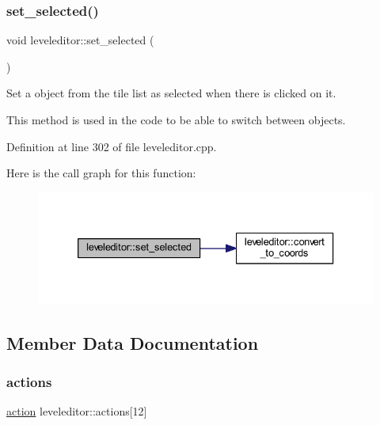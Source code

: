 \subsubsection{\texorpdfstring{set\+\_\+selected()}{set\_selected()}}
{\footnotesize\ttfamily void leveleditor\+::set\+\_\+selected (\begin{DoxyParamCaption}{ }\end{DoxyParamCaption})\hspace{0.3cm}{\ttfamily [private]}}



Set a object from the tile list as selected when there is clicked on it. 

This method is used in the code to be able to switch between objects. 

Definition at line 302 of file leveleditor.\+cpp.

Here is the call graph for this function\+:
\nopagebreak
\begin{figure}[H]
\begin{center}
\leavevmode
\includegraphics[width=333pt]{classleveleditor_a6579d63ca18e84f7a335bf8072f798cc_cgraph}
\end{center}
\end{figure}


\subsection{Member Data Documentation}
\mbox{\label{classleveleditor_a17bf53d8483496da9967d5344293db54}} 
\subsubsection{\texorpdfstring{actions}{actions}}
{\footnotesize\ttfamily \hyperlink{classaction}{action} leveleditor\+::actions\mbox{[}12\mbox{]}\hspace{0.3cm}{\ttfamily [private]}}

